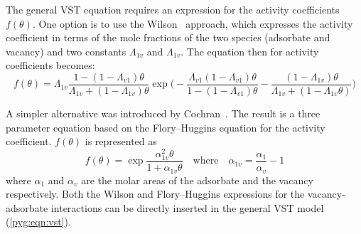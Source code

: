 The general \gls{VST} equation requires an expression for the activity
coefficients \(f(\theta)\). One option is to use the
Wilson~\cite{suwanayuenGasAdsorptionIsotherm1980} approach,
which expresses the activity coefficient in terms
of the mole fractions of the two species (adsorbate and vacancy) and
two constants \(\Lambda_{1v}\) and \(\Lambda_{1v}\). The equation
then for activity coefficients becomes:
%
\begin{equation}\label{pyg:eqn:wvst}
	f(\theta) = \Lambda_{1v}
	\frac{1-(1-\Lambda_{v1})\theta}{\Lambda_{1v}+(1-\Lambda_{1v})\theta}
	\exp{\bigg(
		-\frac{\Lambda_{v1}(1-\Lambda_{v1})\theta}{1-(1-\Lambda_{v1})\theta}
		-\frac{(1 - \Lambda_{1v})\theta}{\Lambda_{1v} +
			(1-\Lambda_{1v}\theta)} \bigg)}
\end{equation}

A simpler alternative was introduced by
Cochran~\cite{cochranVacancySolutionTheory1985}. The result is a
three parameter equation based on the Flory–Huggins equation for the
activity coefficient. \(f(\theta)\) is represented as
%
\begin{equation}\label{pyg:eqn:fhvst}
	f(\theta) =
	\exp{\frac{\alpha^2_{1v}\theta}{1+\alpha_{1v}\theta}}
	\quad \text{where} \quad
	\alpha_{1v} = \frac{\alpha_{1}}{\alpha_{v}} - 1
\end{equation}
%
where \(\alpha_{1}\) and \(\alpha_{v}\) are the molar areas of the
adsorbate and the vacancy respectively.
Both the Wilson and Flory–Huggins expressions for the vacancy-adsorbate
interactions can be directly inserted in the general \gls{VST} model
(\autoref{pyg:eqn:vst}).
